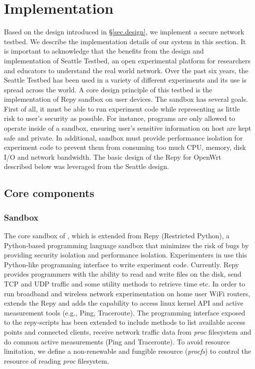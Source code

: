 \chapter{Implementation} 
\label{sec.implementation}

Based on the design introduced in \S{\ref{sec.design}}, we implement a 
secure network testbed. We describe the implementation details of our system 
in this section. It is important to acknowledge that the \sysname benefits from the design and implementation of Seattle Testbed, an open experimental platform for researchers and educators to understand the real world network. Over the past six years, the Seattle Testbed has been used in a variety of different experiments and its use is spread across the world. A core design principle of this testbed is the implementation of Repy sandbox on user devices. The sandbox has several goals. First of all, it must be able to run experiment code while representing as little risk to user's security as possible. For instance, programs are only allowed to operate inside of a sandbox, ensuring user's sensitive information on host are kept safe and private. In additional, sandbox must provide performance isolation for experiment code to prevent them from consuming too much CPU, memory, disk I/O and network bandwidth. The basic design of the Repy for OpenWrt described below was leveraged from the Seattle design.

\section{Core components}
\subsection{Sandbox}
\label{sec.sandbox}
The core sandbox of \sandboxname, which is extended from Repy (Restricted Python), a Python-based programming language sandbox that minimizes the risk of bugs by providing security isolation and performance isolation. Experimenters in \sysname use this Python-like programming interface to write experiment code. Currently. Repy provides programmers with the ability to read and write files on the disk, send TCP and UDP traffic and some utility methods to retrieve time etc. In order to run broadband and wireless network experimentation on home user WiFi routers, \sysname extends the Repy and adds the capability to access linux kernel API and active measurement tools (e.g., Ping, Traceroute). The programming interface exposed to the repy-scripts has been extended to include methods to list available access points and connected clients, receive network traffic data from \textit{proc} filesystem and do common active measurements (Ping and Traceroute). To avoid resource limitation, we define a non-renewable and fungible resource\cite{li2015fence} (\textit{procfs}) to control the resource of reading \textit{proc} filesystem. 

